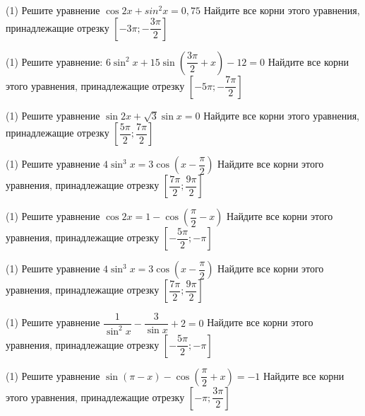 %

\begin{class}[number=1]
	\begin{listofex}
		\item 
		\begin{tasks}(1)
			\task Решите уравнение \( \cos2x+sin^2x=0,75 \)
			\task Найдите все корни этого уравнения, принадлежащие отрезку \( \left[ -3\pi; -\dfrac{3\pi}{2}\right] \) 
		\end{tasks}
		\item 
		\begin{tasks}(1)
			\task Решите уравнение: \( 6\sin^2x+15\sin\left( \dfrac{3\pi}{2}+x \right)-12=0 \)
			\task Найдите все корни этого уравнения, принадлежащие отрезку \( \left[ -5\pi; -\dfrac{7\pi}{2}\right] \) 
		\end{tasks}
		\item 
		\begin{tasks}(1)
			\task Решите уравнение \( \sin2x+\sqrt{3}\sin x=0 \)
			\task Найдите все корни этого уравнения, принадлежащие отрезку \( \left[ \dfrac{5\pi}{2}; \dfrac{7\pi}{2}\right] \) 
		\end{tasks}
		\item 
		\begin{tasks}(1)
			\task Решите уравнение \( 4\sin^3x=3\cos\left( x-\dfrac{\pi}{2} \right) \)
			\task Найдите все корни этого уравнения, принадлежащие отрезку \( \left[ \dfrac{7\pi}{2}; \dfrac{9\pi}{2}\right] \) 
		\end{tasks}
		\item 
		\begin{tasks}(1)
			\task Решите уравнение \( \cos2x=1-\cos\left( \dfrac{\pi}{2}-x \right) \)
			\task Найдите все корни этого уравнения, принадлежащие отрезку \( \left[ -\dfrac{5\pi}{2}; -\pi\right] \) 
		\end{tasks}
		\item 
		\begin{tasks}(1)
			\task Решите уравнение \( 4\sin^3x=3\cos\left( x-\dfrac{\pi}{2} \right) \)
			\task Найдите все корни этого уравнения, принадлежащие отрезку \( \left[ \dfrac{7\pi}{2}; \dfrac{9\pi}{2}\right] \) 
		\end{tasks}
		\item 
		\begin{tasks}(1)
			\task Решите уравнение \( \dfrac{1}{\sin^2x}-\dfrac{3}{\sin x}+2=0 \)
			\task Найдите все корни этого уравнения, принадлежащие отрезку \( \left[ -\dfrac{5\pi}{2}; -\pi\right] \) 
		\end{tasks}
		\item 
		\begin{tasks}(1)
			\task Решите уравнение \( \sin(\pi-x)-\cos\left( \dfrac{\pi}{2}+x \right)=-1 \)
			\task Найдите все корни этого уравнения, принадлежащие отрезку \( \left[ -\pi; \dfrac{3\pi}{2}\right] \) 
		\end{tasks}
	\end{listofex}
\end{class}

